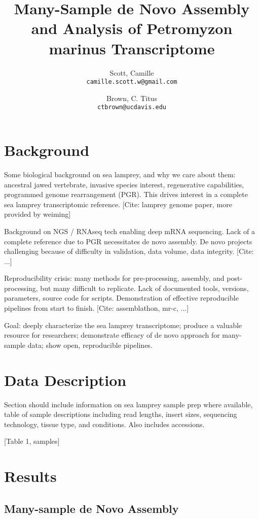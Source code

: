 \documentclass{article}
\title{Many-Sample de Novo Assembly and Analysis of Petromyzon marinus Transcriptome}
\author{
    Scott, Camille\\
    \texttt{camille.scott.w@gmail.com}   %
    \and
    Brown, C. Titus\\
    \texttt{ctbrown@ucdavis.edu}
}
\begin{document}
\maketitle

\section*{Background}

Some biological background on sea lamprey, and why we care about them: ancestral jawed vertebrate, 
invasive species interest, regenerative capabilities, programmed genome rearrangement (PGR). This 
drives interest in a complete sea lamprey transcriptomic reference. [Cite: lamprey genome paper, 
more provided by weiming]

Background on NGS / RNAseq tech enabling deep mRNA sequencing. Lack of a complete reference due 
to PGR necessitates de novo assembly. De novo projects challenging because of difficulty in 
validation, data volume, data integrity. [Cite: ...]

Reproducibility crisis: many methods for pre-processing, assembly, and post-processing, but many 
difficult to replicate. Lack of documented tools, versions, parameters, source code for scripts. 
Demonstration of effective reproducible pipelines from start to finish. [Cite: assemblathon, mr-c, ...]

Goal: deeply characterize the sea lamprey transcriptome; produce a valuable resource for researchers; 
demonstrate efficacy of de novo approach for many-sample data; show open, reproducible pipelines.

\section*{Data Description}

Section should include information on sea lamprey sample prep where available, table of sample 
descriptions including read lengths, insert sizes, sequencing technology, tissue type, and conditions. 
Also includes accessions.

[Table 1, samples]

\section*{Results}

\subsection*{Many-sample de Novo Assembly}
\end{document}
